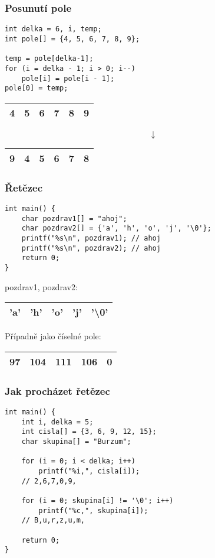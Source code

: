 \documentclass{beamer}
\begin{document}
\begin{frame}[t,fragile]\frametitle{Posunutí pole} 
\begin{verbatim} 
int delka = 6, i, temp;
int pole[] = {4, 5, 6, 7, 8, 9};

temp = pole[delka-1];
for (i = delka - 1; i > 0; i--) 
    pole[i] = pole[i - 1];
pole[0] = temp;
\end{verbatim}

\begin{center}
\begin{tabular}{|c|c|c|c|c|c|}
\hline 4&5&6&7&8&9 \\\hline
\end{tabular}
$$
\downarrow
$$
\begin{tabular}{|c|c|c|c|c|c|}
\hline 9&4&5&6&7&8 \\\hline
\end{tabular}
\end{center}
\end{frame}


\begin{frame}[t,fragile]\frametitle{Řetězec} 
\begin{verbatim} 
int main() {
    char pozdrav1[] = "ahoj";
    char pozdrav2[] = {'a', 'h', 'o', 'j', '\0'};
    printf("%s\n", pozdrav1); // ahoj
    printf("%s\n", pozdrav2); // ahoj
    return 0;     
}
\end{verbatim}

pozdrav1, pozdrav2: \\
\begin{center}
\begin{tabular}{|c|c|c|c|c|}
\hline 'a'&'h'&'o'&'j'&'\textbackslash0' \\\hline
\end{tabular}
\end{center}
\vskip 5mm
Případně jako číselné pole:\\
\begin{center}
\begin{tabular}{|c|c|c|c|c|}
\hline 97 &104 &111 &106 &0 \\\hline
\end{tabular}
\end{center}
\end{frame}



\begin{frame}[t,fragile]\frametitle{Jak procházet řetězec} 
\begin{verbatim} 
int main() {
    int i, delka = 5;
    int cisla[] = {3, 6, 9, 12, 15};
    char skupina[] = "Burzum";

    for (i = 0; i < delka; i++)
        printf("%i,", cisla[i]);
    // 2,6,7,0,9,

    for (i = 0; skupina[i] != '\0'; i++) 
        printf("%c,", skupina[i]);
    // B,u,r,z,u,m,

    return 0;     
}
\end{verbatim}
\end{frame}
\end{document}

